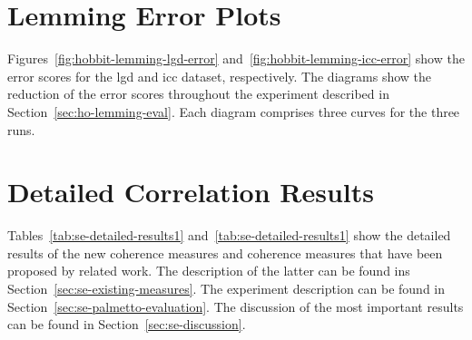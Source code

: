 \section{Lemming Error Plots}
\label{sec:ap-lemming-error-plots}

Figures~\ref{fig:hobbit-lemming-lgd-error} and~\ref{fig:hobbit-lemming-icc-error} show the error scores for the \gls{lgd} and \gls{icc} dataset, respectively. The diagrams show the reduction of the error scores throughout the experiment described in Section~\ref{sec:ho-lemming-eval}. Each diagram comprises three curves for the three runs.



\clearpage%

\section{Detailed Correlation Results}
\label{sec:ap-detailed-correlation-results}

Tables~\ref{tab:se-detailed-results1} and~\ref{tab:se-detailed-results1} show the detailed results of the new coherence measures and coherence measures that have been proposed by related work. The description of the latter can be found ins Section~\ref{sec:se-existing-measures}. The experiment description can be found in Section~\ref{sec:se-palmetto-evaluation}. The discussion of the most important results can be found in Section~\ref{sec:se-discussion}.

